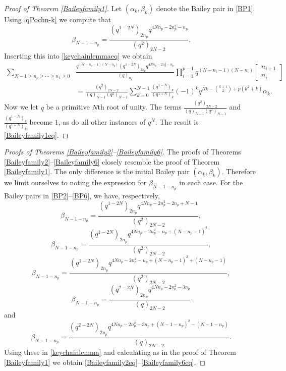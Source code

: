 \documentclass[11pt,reqno]{amsart}
\theoremstyle{definition}
\numberwithin{equation}{section}
\renewcommand{\=}{\;=\;}
\begin{document}
\begin{proof}[Proof of Theorem \ref{Baileyfamily1}]
Let $(\alpha_k,\beta_k)$ denote the Bailey pair in \eqref{BP1}.   Using \eqref{qPochn-k} we compute that
\begin{equation} \label{betan-1-p1}
\beta_{N-1-n_p} = \frac{(q^{1-2N})_{2n_p} q^{4Nn_p-2n_p^2-n_p}}{(q^2)_{2N-2}}.
\end{equation}
Inserting this into \eqref{keychainlemmaeq} we obtain
\begin{equation}
\begin{aligned}
\sum_{N-1 \geq n_p \geq \cdots \geq n_1\geq 0}& \frac{q^{(N-n_p-1)(N-n_p)}(q^{1-2N})_{2n_p} q^{4Nn_p-2n_p^2-n_p}}{(q)_{n_p}} \prod_{i=1}^{p-1} q^{(N-n_i-1)(N-n_i)} \begin{bmatrix} n_{i+1} \\ n_i \end{bmatrix} \\
&= \frac{(q^2)_{2N-2}}{(q)_{N-1}(q^2)_{N-1}} \sum_{k=0}^{N-1} \frac{(q^{1-N})_k}{(q^{1+N})_k}(-1)^k q^{Nk -\binom{k+1}{2} + p(k^2+k)} \alpha_k.
\end{aligned}
\end{equation}
Now we let $q$ be a primitive $N$th root of unity.   The terms $\frac{(q^2)_{2N-2}}{(q)_{N-1}(q^2)_{N-1}}$ and $\frac{(q^{1-N})_k}{(q^{1+N})_k}$ become $1$, as do all other instances of $q^N$.   The result is \eqref{Baileyfamily1eq}.
\end{proof}


\begin{proof}[Proofs of Theorems \ref{Baileyfamily2}--\ref{Baileyfamily6}] 
The proofs of Theorems \ref{Baileyfamily2}--\ref{Baileyfamily6} closely resemble the proof of Theorem \ref{Baileyfamily1}.   The only difference is the initial Bailey pair $(\alpha_k,\beta_k)$.  Therefore we limit ourselves to noting the expression for $\beta_{N-1-n_p}$ in each case.   For the Bailey pairs in \eqref{BP2}--\eqref{BP6}, we have, respectively,
\begin{equation}
\beta_{N-1-n_p} = \frac{(q^{1-2N})_{2n_p} q^{4Nn_p-2n_p^2-2n_p + N-1}}{(q^2)_{2N-2}},
\end{equation} 
\begin{equation} \label{betan-1-p3}
\beta_{N-1-n_p} = \frac{(q^{1-2N})_{2n_p} q^{4Nn_p-2n_p^2-n_p + (N-n_p-1)^2}}{(q^2)_{2N-2}},
\end{equation} 
\begin{equation}
\beta_{N-1-n_p} = \frac{(q^{1-2N})_{2n_p} q^{4Nn_p-2n_p^2-n_p + (N-n_p-1)^2 + (N-n_p-1)}}{(q^2)_{2N-2}},
\end{equation} 
\begin{equation}
\beta_{N-1-n_p} = \frac{(q^{2-2N})_{2n_p} q^{4Nn_p-2n_p^2-3n_p}}{(q)_{2N-2}}
\end{equation}
and
\begin{equation}
\beta_{N-1-n_p} = \frac{(q^{2-2N})_{2n_p} q^{4Nn_p-2n_p^2-3n_p + (N-1-n_p)^2 - (N-1-n_p)}}{(q)_{2N-2}}.
\end{equation}
Using these in \eqref{keychainlemma} and calculating as in the proof of Theorem \ref{Baileyfamily1} we obtain \eqref{Baileyfamily2eq}--\eqref{Baileyfamily6eq}.
\end{proof}
\end{document}
